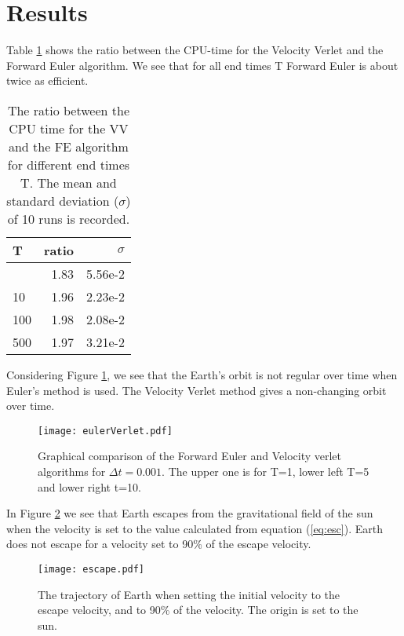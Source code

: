 \section{Results}
\label{sec:results}

Table \ref{table:time} shows the ratio between the CPU-time for the Velocity Verlet and the Forward Euler algorithm. We see that for all end times T Forward Euler is about twice as efficient. 

\begin{table}[htbp]
	\centering
	\begin{tabular}{lrr}
		T   & ratio & $\sigma$     \\
		\hline
		\addlinespace[0.1cm]
		1   & 1.83      & 5.56e-2 \\
		10  & 1.96      & 2.23e-2 \\
		100 & 1.98      & 2.08e-2 \\
		500 & 1.97      & 3.21e-2
	\end{tabular} \caption{The ratio between the CPU time for the VV and the FE algorithm for different end times T. The mean and standard deviation ($\sigma$) of 10 runs is recorded.}\label{table:time}
\end{table}

Considering Figure \ref{fig:compare euler verlet}, we see that the Earth's orbit is not regular over time when Euler's method is used. The Velocity Verlet method gives a non-changing orbit over time. 
\begin{figure}[htbp]
	\centering
	\texttt{[image: eulerVerlet.pdf]}
	\caption{Graphical comparison of the Forward Euler and Velocity verlet algorithms for $\Delta t = 0.001$. The upper one is for T=1, lower left T=5 and lower right t=10.}
	\label{fig:compare euler verlet}
\end{figure}


In Figure \ref{fig:earth escape} we see that Earth escapes from the gravitational field of the sun when the velocity is set to the value calculated from equation (\ref{eq:esc}). Earth does not escape for a velocity set to 90\% of the escape velocity.  
\begin{figure}[htbp]
	\centering
	\texttt{[image: escape.pdf]}
	\caption{The trajectory of Earth when setting the initial velocity to the escape velocity, and to 90\% of the velocity. The origin is set to the sun.}
	\label{fig:earth escape}
\end{figure}

